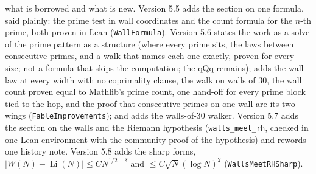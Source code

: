 \documentclass[11pt]{article}
\begin{document}
what is borrowed and what is new. Version 5.5 adds the section on one formula, said plainly: the prime test in wall coordinates and the count formula for the $n$-th prime, both proven in Lean (\texttt{WallFormula}). Version 5.6 states the work as a solve of the prime pattern as a structure (where every prime sits, the laws between consecutive primes, and a walk that names each one exactly, proven for every size; not a formula that skips the computation; the qQq remains); adds the wall law at every width with no coprimality clause, the walk on walls of $30$, the wall count proven equal to Mathlib's prime count, one hand-off for every prime block tied to the hop, and the proof that consecutive primes on one wall are its two wings (\texttt{FableImprovements}); and adds the walls-of-$30$ walker. Version 5.7 adds the section on the walls and the Riemann hypothesis (\texttt{walls\_meet\_rh}, checked in one Lean environment with the community proof of the hypothesis) and rewords one history note. Version 5.8 adds the sharp forms, $|W(N)-\operatorname{Li}(N)| \le C N^{1/2+\delta}$ and $\le C\sqrt{N}(\log N)^2$ (\texttt{WallsMeetRHSharp}).
\end{document}

